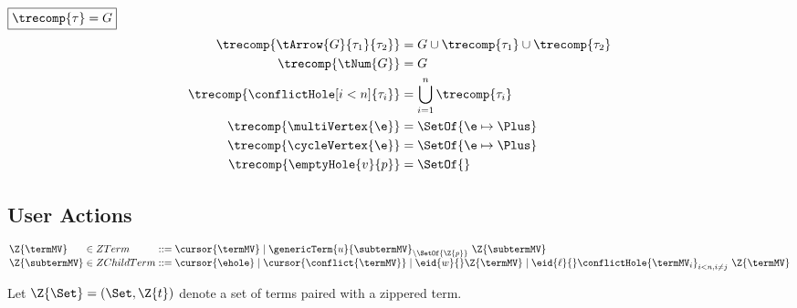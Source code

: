 \noindent $\boxed{\trecomp{\tau} = G}$
%
\begin{align*}
  \trecomp{\tArrow{G}{\tau_1}{\tau_2}}
    &= G \cup \trecomp{\tau_1} \cup \trecomp{\tau_2}
  \\
  \trecomp{\tNum{G}} &= G
  \\
  \trecomp{\conflictHole[i < n]{\tau_i}} &= \bigcup_{i=1}^n \trecomp{\tau_i}
  \\
  \trecomp{\multiVertex{\e}} &= \SetOf{\e \mapsto \Plus}
  \\
  \trecomp{\cycleVertex{\e}} &= \SetOf{\e \mapsto \Plus}
  \\
  \trecomp{\emptyHole{v}{p}} &= \SetOf{}
\end{align*}


\subsection{User Actions}

\[
  \arraycolsep=0pt
  \begin{array}{lcllll}
    \Z{\termMV} & {}\in{} & ZTerm & {}::={} &
      \cursor{\termMV}
      \mid \genericTerm{u}{\subtermMV}_{\setminus\SetOf{\Z{p}}}\ \Z{\subtermMV}
      \\
    \Z{\subtermMV} & {}\in{} & ZChildTerm & {}::={} &
      \cursor{\ehole}
      \mid \cursor{\conflict{\termMV}}
      \mid \eid{w}{}\Z{\termMV}
      \mid \eid{\ell}{}\conflictHole{\termMV_i}_{i<n,i\neq j}\ \Z{\termMV}
    \\
  \end{array}
\]



Let $\Z{\Set} = (\Set, \Z{t})$ denote a set of terms paired with a zippered term.




